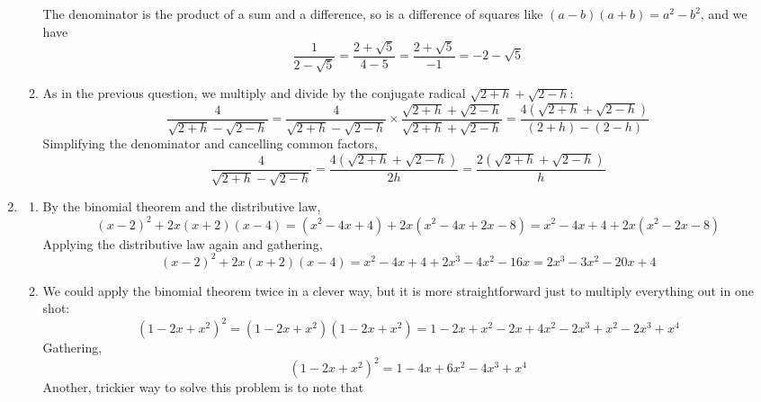 \documentclass{article}
\begin{document}
\begin{enumerate}
\begin{enumerate}
\begin{equation*}
    \end{equation*}
    The denominator is the product of a sum and a difference, so is a 
    difference of squares like 
    $(a-b)(a+b)=a^2-b^2$, and we have
    \begin{equation*}
      \frac{1}{2-\sqrt{5}} = \frac{2+\sqrt{5}}{4-5} 
      = \frac{2+\sqrt{5}}{-1} = -2-\sqrt{5}
    \end{equation*}
  \item As in the previous question, we multiply and divide by the 
    conjugate radical $\sqrt{2+h}+\sqrt{2-h}$:
    \begin{equation*}
      \frac{4}{\sqrt{2+h}-\sqrt{2-h}}
      = \frac{4}{\sqrt{2+h}-\sqrt{2-h}} \times 
      \frac{\sqrt{2+h}+\sqrt{2-h}}{\sqrt{2+h}+\sqrt{2-h}}
      = \frac{4(\sqrt{2+h}+\sqrt{2-h})}{(2+h)-(2-h)}
    \end{equation*}
    Simplifying the denominator and cancelling common factors,
    \begin{equation*}
      \frac{4}{\sqrt{2+h}-\sqrt{2-h}}
      = \frac{4(\sqrt{2+h}+\sqrt{2-h})}{2h}
      = \frac{2(\sqrt{2+h}+\sqrt{2-h})}{h}
    \end{equation*}
  \end{enumerate}
\item %
  \begin{enumerate}
  \item By the binomial theorem and the distributive law,
    \begin{equation*}
      (x-2)^2 +2x(x+2)(x-4)
      = (x^2-4x+4) + 2x(x^2-4x+2x-8)
      = x^2 - 4x + 4 + 2x(x^2-2x-8)
    \end{equation*}
    Applying the distributive law again and gathering,
    \begin{equation*}
      (x-2)^2 +2x(x+2)(x-4)
      = x^2 -4x + 4 + 2x^3 -4x^2 -16x
      = 2x^3 - 3x^2 -20x + 4
    \end{equation*}
  \item We could apply the binomial theorem twice in a clever way, but
    it is more straightforward just to multiply everything out in one shot:
    \begin{equation*}
      (1-2x+x^2)^2
      = (1-2x+x^2)(1-2x+x^2)
      = 1-2x+x^2-2x+4x^2-2x^3+x^2-2x^3+x^4
    \end{equation*}
    Gathering,
    \begin{equation*}
      (1-2x+x^2)^2
      = 1-4x+6x^2-4x^3+x^4
    \end{equation*}
    Another, trickier way to solve this problem is to note that 

\end{enumerate}
\end{enumerate}
\end{document}
